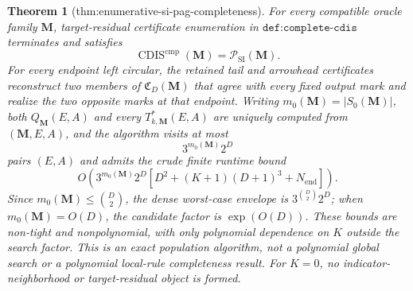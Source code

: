 \documentclass{article}
\newtheorem{theorem}{Theorem}
\begin{document}
\begin{theorem}[thm:enumerative-si-pag-completeness]\label{thm:enumerative-si-pag-completeness}
For every compatible oracle family \(\mathbf M\), target-residual certificate enumeration in \(\texttt{def:complete-cdis}\) terminates and satisfies
\[
\operatorname{CDIS}^{\mathrm{cmp}}(\mathbf M)=\mathcal P_{\mathrm{SI}}(\mathbf M).
\]
For every endpoint left circular, the retained tail and arrowhead certificates reconstruct two members of \(\mathfrak C_D(\mathbf M)\) that agree with every fixed output mark and realize the two opposite marks at that endpoint.  Writing \(m_0(\mathbf M)=|S_0(\mathbf M)|\), both \(Q_{\mathbf M}(E,A)\) and every \(T^*_{k,\mathbf M}(E,A)\) are uniquely computed from \((\mathbf M,E,A)\), and the algorithm visits at most
\[
3^{m_0(\mathbf M)}2^D
\]
pairs \((E,A)\) and admits the crude finite runtime bound
\[
O\!\left(3^{m_0(\mathbf M)}2^D
\left[D^2+(K+1)(D+1)^3+N_{\mathrm{end}}\right]\right).
\]
Since \(m_0(\mathbf M)\le\binom D2\), the dense worst-case envelope is \(3^{\binom D2}2^D\); when \(m_0(\mathbf M)=O(D)\), the candidate factor is \(\exp(O(D))\).  These bounds are non-tight and nonpolynomial, with only polynomial dependence on \(K\) outside the search factor.  This is an exact population algorithm, not a polynomial global search or a polynomial local-rule completeness result.  For \(K=0\), no indicator-neighborhood or target-residual object is formed.
\end{theorem}
\end{document}
